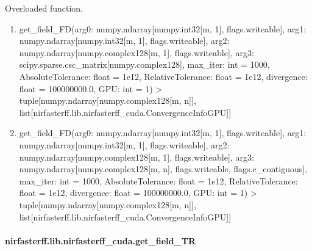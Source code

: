 \documentclass[letterpaper,10pt,english]{sphinxmanual}
\begin{document}
\begin{fulllineitems}
\label{\detokenize{_autosummary/nirfasterff.lib.nirfasterff_cuda.get_field_FD:nirfasterff.lib.nirfasterff_cuda.get_field_FD}}
\pysigstartsignatures
{}
\pysigstopsignatures
\sphinxAtStartPar
Overloaded function.
\begin{enumerate}
%
\item {} 
\sphinxAtStartPar
get\_field\_FD(arg0: numpy.ndarray{[}numpy.int32{[}m, 1{]}, flags.writeable{]}, arg1: numpy.ndarray{[}numpy.int32{[}m, 1{]}, flags.writeable{]}, arg2: numpy.ndarray{[}numpy.complex128{[}m, 1{]}, flags.writeable{]}, arg3: scipy.sparse.csc\_matrix{[}numpy.complex128{]}, max\_iter: int = 1000, AbsoluteTolerance: float = 1e\sphinxhyphen{}12, RelativeTolerance: float = 1e\sphinxhyphen{}12, divergence: float = 100000000.0, GPU: int = \sphinxhyphen{}1) \sphinxhyphen{}\textgreater{} tuple{[}numpy.ndarray{[}numpy.complex128{[}m, n{]}{]}, list{[}nirfasterff.lib.nirfasterff\_cuda.ConvergenceInfoGPU{]}{]}

\item {} 
\sphinxAtStartPar
get\_field\_FD(arg0: numpy.ndarray{[}numpy.int32{[}m, 1{]}, flags.writeable{]}, arg1: numpy.ndarray{[}numpy.int32{[}m, 1{]}, flags.writeable{]}, arg2: numpy.ndarray{[}numpy.complex128{[}m, 1{]}, flags.writeable{]}, arg3: numpy.ndarray{[}numpy.complex128{[}m, n{]}, flags.writeable, flags.c\_contiguous{]}, max\_iter: int = 1000, AbsoluteTolerance: float = 1e\sphinxhyphen{}12, RelativeTolerance: float = 1e\sphinxhyphen{}12, divergence: float = 100000000.0, GPU: int = \sphinxhyphen{}1) \sphinxhyphen{}\textgreater{} tuple{[}numpy.ndarray{[}numpy.complex128{[}m, n{]}{]}, list{[}nirfasterff.lib.nirfasterff\_cuda.ConvergenceInfoGPU{]}{]}

\end{enumerate}

\end{fulllineitems}


\sphinxstepscope


\paragraph{nirfasterff.lib.nirfasterff\_cuda.get\_field\_TR}
\label{\detokenize{_autosummary/nirfasterff.lib.nirfasterff_cuda.get_field_TR:nirfasterff-lib-nirfasterff-cuda-get-field-tr}}\label{\detokenize{_autosummary/nirfasterff.lib.nirfasterff_cuda.get_field_TR::doc}}
\end{document}
